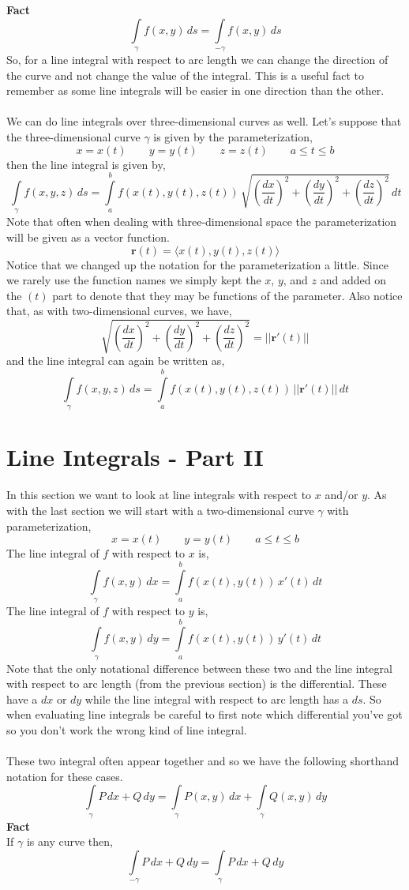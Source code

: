 \documentclass[10pt,reqno]{book}
\theoremstyle{definition}
\renewcommand{\vec}[1]{\mathbf{#1}}
\begin{document}
	\textbf{Fact}\\
	\[ \int\limits_{\gamma} f(x,y)\,ds = \int\limits_{-\gamma} f(x,y)\,ds \]
	So, for a line integral with respect to arc length we can change the direction of the curve and not change the value of the integral. This is a useful fact to remember as some line integrals will be easier in one direction than the other.\\ \\
	We can do line integrals over three-dimensional curves as well. Let's suppose that the three-dimensional curve $ \gamma $ is given by the parameterization,
	\[ x = x(t) \qquad y = y(t) \qquad z = z(t) \qquad a \leq t \leq b \]
	then the line integral is given by,
	\[ \int\limits_{\gamma} f(x,y,z)\,ds = \int\limits_a^b f(x(t),y(t),z(t))\,\sqrt{\left( \frac{dx}{dt} \right)^2 + \left( \frac{dy}{dt} \right)^2 + \left( \frac{dz}{dt} \right)^2 }\,dt \]
	Note that often when dealing with three-dimensional space the parameterization will be given as a vector function.
	\[ \vec{r}(t) = \langle x(t),y(t),z(t) \rangle \]
	Notice that we changed up the notation for the parameterization a little. Since we rarely use the function names we simply kept the $ x $, $ y $, and $ z $ and added on the $ (t) $ part to denote that they may be functions of the parameter. Also notice that, as with two-dimensional curves, we have,
	\[ \sqrt{\left( \frac{dx}{dt} \right)^2 + \left( \frac{dy}{dt} \right)^2 + \left( \frac{dz}{dt} \right)^2 } = ||\vec{r}'(t)|| \]
	and the line integral can again be written as,
	\[ \int\limits_{\gamma} f(x,y,z)\,ds = \int\limits_a^b f(x(t),y(t),z(t))\,||\vec{r}'(t)||\,dt \]
	
	\section{Line Integrals - Part II}
	
	In this section we want to look at line integrals with respect to $ x $ and/or $ y $. As with the last section we will start with a two-dimensional curve $ \gamma $ with parameterization,
	\[ x = x(t) \qquad y = y(t) \qquad a \leq t \leq b \]
	The line integral of $ f $ with respect to $ x $ is,
	\[ \int\limits_{\gamma} f(x,y)\,dx = \int\limits_a^b f(x(t),y(t))\,x'(t)\,dt \]
	The line integral of $ f $ with respect to $ y $ is,
	\[ \int\limits_{\gamma} f(x,y)\,dy = \int\limits_a^b f(x(t),y(t))\,y'(t)\,dt \]
	Note that the only notational difference between these two and the line integral with respect to arc length (from the previous section) is the differential. These have a $ dx $ or $ dy $ while the line integral with respect to arc length has a $ ds $. So when evaluating line integrals be careful to first note which differential you've got so you don't work the wrong kind of line integral.\\ \\
	These two integral often appear together and so we have the following shorthand notation for these cases.
	\[ \int\limits_{\gamma} P\,dx + Q\,dy = \int\limits_{\gamma} P(x,y)\,dx + \int\limits_{\gamma} Q(x,y)\,dy  \]
	\textbf{Fact}\\
	If $ \gamma $ is any curve then,
	\[ \int\limits_{-\gamma} P\,dx + Q\,dy = \int\limits_{\gamma} P\,dx + Q\,dy \]
	
\end{document}
